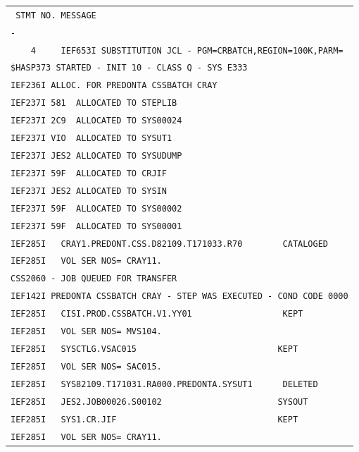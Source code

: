 \begin{tabular}{l}
\texttt{\ STMT\ NO.\ MESSAGE} \\
\texttt{-} \\
\texttt{\ \ \ \ 4\ \ \ \ \ IEF653I\ SUBSTITUTION\ JCL\ -\ PGM=CRBATCH,REGION=100K,PARM=} \\
\texttt{\$HASP373\ STARTED\ -\ INIT\ 10\ -\ CLASS\ Q\ -\ SYS\ E333} \\
\texttt{IEF236I\ ALLOC.\ FOR\ PREDONTA\ CSSBATCH\ CRAY} \\
\texttt{IEF237I\ 581\ \ ALLOCATED\ TO\ STEPLIB} \\
\texttt{IEF237I\ 2C9\ \ ALLOCATED\ TO\ SYS00024} \\
\texttt{IEF237I\ VIO\ \ ALLOCATED\ TO\ SYSUT1} \\
\texttt{IEF237I\ JES2\ ALLOCATED\ TO\ SYSUDUMP} \\
\texttt{IEF237I\ 59F\ \ ALLOCATED\ TO\ CRJIF} \\
\texttt{IEF237I\ JES2\ ALLOCATED\ TO\ SYSIN} \\
\texttt{IEF237I\ 59F\ \ ALLOCATED\ TO\ SYS00002} \\
\texttt{IEF237I\ 59F\ \ ALLOCATED\ TO\ SYS00001} \\
\texttt{IEF285I\ \ \ CRAY1.PREDONT.CSS.D82109.T171033.R70\ \ \ \ \ \ \ \ CATALOGED} \\
\texttt{IEF285I\ \ \ VOL\ SER\ NOS=\ CRAY11.} \\
\texttt{CSS2060\ -\ JOB\ QUEUED\ FOR\ TRANSFER} \\
\texttt{IEF142I\ PREDONTA\ CSSBATCH\ CRAY\ -\ STEP\ WAS\ EXECUTED\ -\ COND\ CODE\ 0000} \\
\texttt{IEF285I\ \ \ CISI.PROD.CSSBATCH.V1.YY01\ \ \ \ \ \ \ \ \ \ \ \ \ \ \ \ \ \ KEPT} \\
\texttt{IEF285I\ \ \ VOL\ SER\ NOS=\ MVS104.} \\
\texttt{IEF285I\ \ \ SYSCTLG.VSAC015\ \ \ \ \ \ \ \ \ \ \ \ \ \ \ \ \ \ \ \ \ \ \ \ \ \ \ \ KEPT} \\
\texttt{IEF285I\ \ \ VOL\ SER\ NOS=\ SAC015.} \\
\texttt{IEF285I\ \ \ SYS82109.T171031.RA000.PREDONTA.SYSUT1\ \ \ \ \ \ DELETED} \\
\texttt{IEF285I\ \ \ JES2.JOB00026.S00102\ \ \ \ \ \ \ \ \ \ \ \ \ \ \ \ \ \ \ \ \ \ \ SYSOUT} \\
\texttt{IEF285I\ \ \ SYS1.CR.JIF\ \ \ \ \ \ \ \ \ \ \ \ \ \ \ \ \ \ \ \ \ \ \ \ \ \ \ \ \ \ \ \ KEPT} \\
\texttt{IEF285I\ \ \ VOL\ SER\ NOS=\ CRAY11.} \\

\end{tabular}
